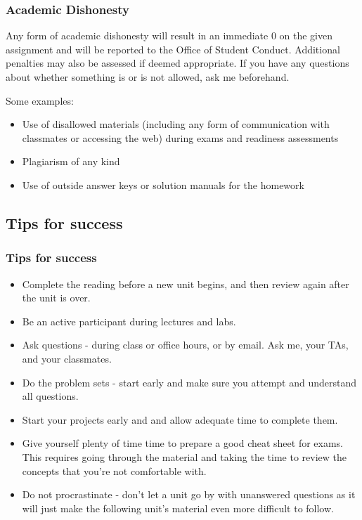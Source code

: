 \documentclass[11pt,containsverbatim,handout,xcolor=xelatex,dvipsnames,table]{beamer}
\begin{document}
\begin{frame}
\frametitle{Academic Dishonesty}

Any form of academic dishonesty will result in an immediate 0 on the given assignment and will be reported to the Office of Student Conduct. Additional penalties may also be assessed if deemed appropriate. If you have any questions about whether something is or is not allowed, ask me beforehand.

Some examples:

\begin{itemize}

\item Use of disallowed materials (including any form of communication with classmates or accessing the web) during exams and readiness assessments

\item Plagiarism of any kind

\item Use of outside answer keys or solution manuals for the homework

\end{itemize}

\end{frame}


\subsection{Tips for success}


\begin{frame}
\frametitle{Tips for success}

{\footnotesize
\begin{itemize}[<alert@+>]
\item Complete the reading before a new unit begins, and then review again after the unit is over.
\item Be an active participant during lectures and labs.
\item Ask questions - during class or office hours, or by email. Ask me, your TAs, and your classmates.
\item Do the problem sets - start early and make sure you attempt and understand all questions.
\item Start your projects early and and allow adequate time to complete them.
\item Give yourself plenty of time time to prepare a good cheat sheet for exams. This requires going through the material and taking the time to review the concepts that you're not comfortable with.
\item Do not procrastinate - don't let a unit go by with unanswered questions as it will just make the following unit's material even more difficult to follow. 
\end{itemize}
}

\end{frame}
\end{document}
